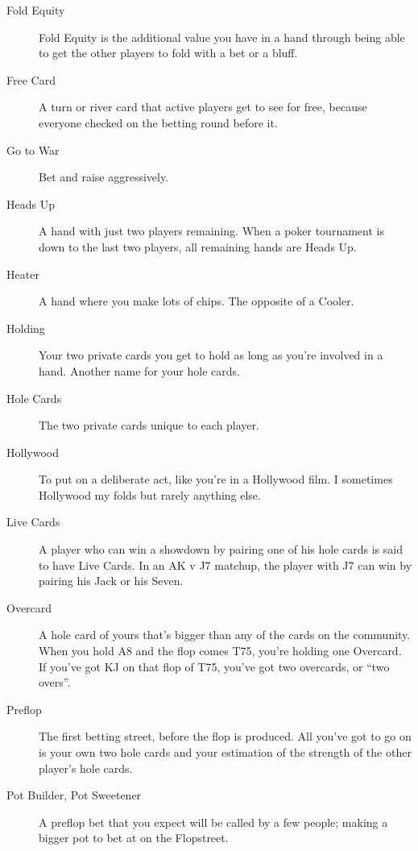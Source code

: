 \begin{description}
\item[Fold Equity] Fold Equity is the additional value you have in a
hand through being able to get the other players to fold with a bet or
a bluff.

\item[Free Card] A turn or river card that active players get to see
for free, because everyone checked on the betting round before it.

\item[Go to War] Bet and raise aggressively.

\item[Heads Up] A hand with just two players remaining. When a poker
tournament is down to the last two players, all remaining hands are
Heads Up.

\item[Heater] A hand where you make lots of chips. The opposite of a
Cooler.

\item[Holding] Your two private cards you get to hold as long as
you're involved in a hand. Another name for your hole cards.

\item[Hole Cards] The two private cards unique to each player.

\item[Hollywood] To put on a deliberate act, like you're in a
Hollywood film. I sometimes Hollywood my folds but rarely anything
else.

\item[Live Cards] A player who can win a showdown by pairing one of
his hole cards is said to have Live Cards. In an AK v J7 matchup, the
player with J7 can win by pairing his Jack or his Seven.

\item[Overcard] A hole card of yours that's bigger than any of the
cards on the community. When you hold A8 and the flop comes T75,
you're holding one Overcard. If you've got KJ on that flop of T75,
you've got two overcards, or ``two overs''.

\item[Preflop] The first betting street, before the flop is produced.
All you've got to go on is your own two hole cards and your estimation
of the strength of the other player's hole cards.

\item[Pot Builder, Pot Sweetener] A preflop bet that you expect will
be called by a few people; making a bigger pot to bet at on the
Flopstreet.


\end{description}
